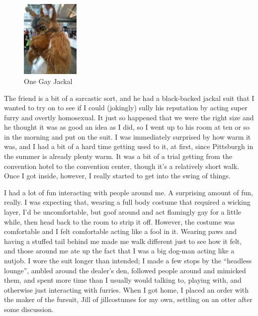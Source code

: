 \begin{figure}
  \begin{center}
    \includegraphics[width=0.25\textwidth]{content/assets/dressing-up--gayjackal}
  \end{center}
  \caption{One Gay Jackal}
\end{figure}
The friend is a bit of a sarcastic sort, and he had a black-backed jackal suit that I wanted to try on to see if I could (jokingly) sully his reputation by acting super furry and overtly homosexual.  It just so happened that we were the right size and he thought it was as good an idea as I did, so I went up to his room at ten or so in the morning and put on the suit.  I was immediately surprised by how warm it was, and I had a bit of a hard time getting used to it, at first, since Pittsburgh in the summer is already plenty warm.  It was a bit of a trial getting from the convention hotel to the convention center, though it's a relatively short walk.  Once I got inside, however, I really started to get into the swing of things.

I had a lot of fun interacting with people around me.  A surprising amount of fun, really.  I was expecting that, wearing a full body costume that required a wicking layer, I'd be uncomfortable, but goof around and act flamingly gay for a little while, then head back to the room to strip it off.  However, the costume was comfortable and I felt comfortable acting like a fool in it.  Wearing paws and having a stuffed tail behind me made me walk different just to see how it felt, and those around me ate up the fact that I was a big dog-man acting like a nutjob.  I wore the suit longer than intended; I made a few stops by the ``headless lounge'', ambled around the dealer's den, followed people around and mimicked them, and spent more time than I usually would talking to, playing with, and otherwise just interacting with furries.  When I got home, I placed an order with the maker of the fursuit, Jill of jillcostumes for my own, settling on an otter after some discussion.

